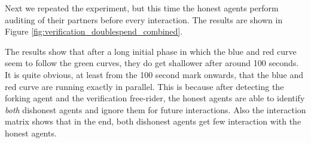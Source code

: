 Next we repeated the experiment, but this time the honest agents perform auditing of their
partners before every interaction. The results are shown in Figure \ref{fig:verification_doublespend_combined}. 

The results show that after a long initial phase in which the blue and red curve seem to follow 
the green curves, they do get shallower after around 100 seconds. It is quite obvious, at least 
from the 100 second mark onwards, that the blue and red curve are running exactly in parallel. This is
because after detecting the forking agent and the verification free-rider, the honest agents are 
able to identify \textit{both} dishonest agents and ignore them for future interactions. Also the interaction
matrix shows that in the end, both dishonest agents get few interaction with the honest agents. 

